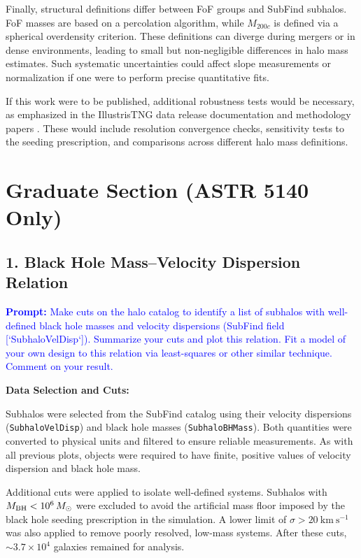 \documentclass[twocolumn]{aastex631}
\begin{document}
Finally, structural definitions differ between FoF groups and SubFind subhalos. FoF masses are based on a percolation algorithm, while $M_{200c}$ is defined via a spherical overdensity criterion. These definitions can diverge during mergers or in dense environments, leading to small but non-negligible differences in halo mass estimates. Such systematic uncertainties could affect slope measurements or normalization if one were to perform precise quantitative fits.

If this work were to be published, additional robustness tests would be necessary, as emphasized in the IllustrisTNG data release documentation and methodology papers \citep{Nelson2019TNG_PublicData}. These would include resolution convergence checks, sensitivity tests to the seeding prescription, and comparisons across different halo mass definitions.

\section{Graduate Section (ASTR 5140 Only)}

\subsection{1. Black Hole Mass--Velocity Dispersion Relation}
\textcolor{blue}{\textbf{Prompt:} Make cuts on the halo catalog to identify a list of subhalos with well-defined black hole masses and velocity dispersions (SubFind field [`SubhaloVelDisp`]). Summarize your cuts and plot this relation. Fit a model of your own design to this relation via least-squares or other similar technique. Comment on your result.}

\textbf{Data Selection and Cuts:}

Subhalos were selected from the SubFind catalog using their velocity dispersions
(\texttt{SubhaloVelDisp}) and black hole masses (\texttt{SubhaloBHMass}).
Both quantities were converted to physical units and filtered to ensure reliable measurements.
As with all previous plots, objects were required to have finite, positive values of velocity dispersion and black hole mass.

Additional cuts were applied to isolate well-defined systems. Subhalos with
$M_{\rm BH} < 10^{6}\,M_\odot$ were excluded to avoid the artificial mass floor imposed by the
black hole seeding prescription in the simulation. A lower limit of
$\sigma > 20\ \mathrm{km\ s^{-1}}$ was also applied to remove poorly resolved, low-mass systems.
After these cuts, \(\sim 3.7\times10^{4}\) galaxies remained for analysis.
\end{document}
